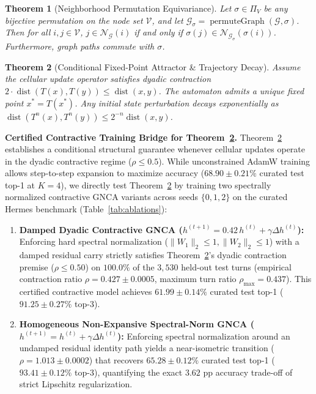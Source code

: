 \documentclass[10pt,twocolumn,letterpaper]{article}
\newtheorem{theorem}{Theorem}
\begin{document}
\begin{theorem}[Neighborhood Permutation Equivariance]\label{thm:equivariance}
Let $\sigma \in \Pi_V$ be any bijective permutation on the node set $\mathcal{V}$, and let $\mathcal{G}_\sigma = \operatorname{permuteGraph}(\mathcal{G}, \sigma)$. Then for all $i, j \in \mathcal{V}$, $j \in \mathcal{N}_{\mathcal{G}}(i)$ if and only if $\sigma(j) \in \mathcal{N}_{\mathcal{G}_\sigma}(\sigma(i))$. Furthermore, graph paths commute with $\sigma$.
\end{theorem}

\begin{theorem}[Conditional Fixed-Point Attractor \& Trajectory Decay]\label{thm:contraction}
Assume the cellular update operator satisfies dyadic contraction $2 \cdot \operatorname{dist}(T(x), T(y)) \le \operatorname{dist}(x, y)$. The automaton admits a unique fixed point $x^* = T(x^*)$. Any initial state perturbation decays exponentially as $\operatorname{dist}(T^n(x), T^n(y)) \le 2^{-n} \operatorname{dist}(x, y)$.
\end{theorem}

\noindent\textbf{Certified Contractive Training Bridge for Theorem~\ref{thm:contraction}.} Theorem~\ref{thm:contraction} establishes a conditional structural guarantee whenever cellular updates operate in the dyadic contractive regime ($\rho \le 0.5$). While unconstrained AdamW training allows step-to-step expansion to maximize accuracy ($68.90 \pm 0.21\%$ curated test top-1 at $K=4$), we directly test Theorem~\ref{thm:contraction} by training two spectrally normalized contractive GNCA variants across seeds $\{0,1,2\}$ on the curated Hermes benchmark (Table~\ref{tab:ablations}):
\begin{enumerate}[leftmargin=1.5em, itemsep=0.05em]
  \item \textbf{Damped Dyadic Contractive GNCA ($h^{(t+1)} = 0.42\,h^{(t)} + \gamma \Delta h^{(t)}$):} Enforcing hard spectral normalization ($\|W_1\|_2 \le 1, \|W_2\|_2 \le 1$) with a damped residual carry strictly satisfies Theorem~\ref{thm:contraction}'s dyadic contraction premise ($\rho \le 0.50$) on $\mathbf{100.0\%}$ of the $3{,}530$ held-out test turns (empirical contraction ratio $\rho = \mathbf{0.427 \pm 0.0005}$, maximum turn ratio $\rho_{\max} = 0.437$). This certified contractive model achieves $\mathbf{61.99 \pm 0.14\%}$ curated test top-1 ($91.25 \pm 0.27\%$ top-3).
  \item \textbf{Homogeneous Non-Expansive Spectral-Norm GNCA ($h^{(t+1)} = h^{(t)} + \gamma \Delta h^{(t)}$):} Enforcing spectral normalization around an undamped residual identity path yields a near-isometric transition ($\rho = 1.013 \pm 0.0002$) that recovers $\mathbf{65.28 \pm 0.12\%}$ curated test top-1 ($93.41 \pm 0.12\%$ top-3), quantifying the exact $3.62\text{ pp}$ accuracy trade-off of strict Lipschitz regularization.
\end{enumerate}
\end{document}
